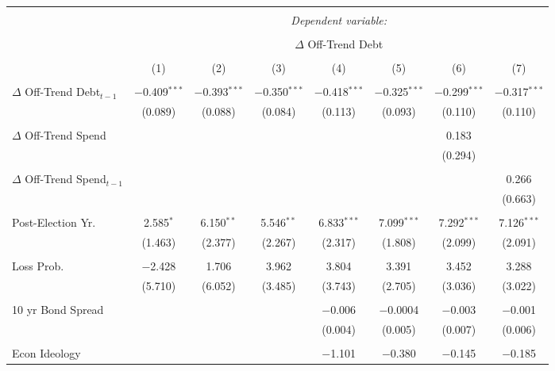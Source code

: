 
\begingroup 
\tiny 
\begin{tabular}{@{\extracolsep{5pt}}lccccccc} 
\\[-1.8ex]\hline 
\hline \\[-1.8ex] 
 & \multicolumn{7}{c}{\textit{Dependent variable:}} \\ 
\cline{2-8} 
\\[-1.8ex] & \multicolumn{7}{c}{$\Delta$ Off-Trend Debt} \\ 
\\[-1.8ex] & (1) & (2) & (3) & (4) & (5) & (6) & (7)\\ 
\hline \\[-1.8ex] 
 $\Delta$ Off-Trend Debt$_{t-1}$ & $-$0.409$^{***}$ & $-$0.393$^{***}$ & $-$0.350$^{***}$ & $-$0.418$^{***}$ & $-$0.325$^{***}$ & $-$0.299$^{***}$ & $-$0.317$^{***}$ \\ 
  & (0.089) & (0.088) & (0.084) & (0.113) & (0.093) & (0.110) & (0.110) \\ 
  & & & & & & & \\ 
 $\Delta$ Off-Trend Spend &  &  &  &  &  & 0.183 &  \\ 
  &  &  &  &  &  & (0.294) &  \\ 
  & & & & & & & \\ 
 $\Delta$ Off-Trend Spend$_{t-1}$ &  &  &  &  &  &  & 0.266 \\ 
  &  &  &  &  &  &  & (0.663) \\ 
  & & & & & & & \\ 
 Post-Election Yr. & 2.585$^{*}$ & 6.150$^{**}$ & 5.546$^{**}$ & 6.833$^{***}$ & 7.099$^{***}$ & 7.292$^{***}$ & 7.126$^{***}$ \\ 
  & (1.463) & (2.377) & (2.267) & (2.317) & (1.808) & (2.099) & (2.091) \\ 
  & & & & & & & \\ 
 Loss Prob. & $-$2.428 & 1.706 & 3.962 & 3.804 & 3.391 & 3.452 & 3.288 \\ 
  & (5.710) & (6.052) & (3.485) & (3.743) & (2.705) & (3.036) & (3.022) \\ 
  & & & & & & & \\ 
 10 yr Bond Spread &  &  &  & $-$0.006 & $-$0.0004 & $-$0.003 & $-$0.001 \\ 
  &  &  &  & (0.004) & (0.005) & (0.007) & (0.006) \\ 
  & & & & & & & \\ 
 Econ Ideology &  &  &  & $-$1.101 & $-$0.380 & $-$0.145 & $-$0.185 \\ 

\end{tabular}
